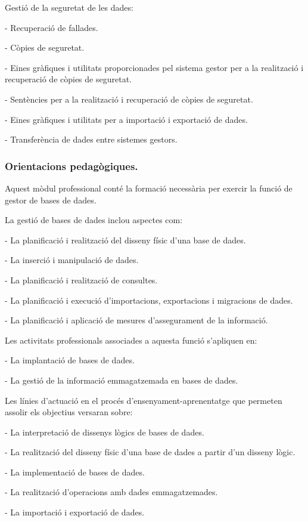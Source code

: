 \documentclass[catalan, a4paper, 12pt, titlepage]{article}
\begin{document}
Gestió de la seguretat de les dades:

- Recuperació de fallades.

- Còpies de seguretat.

- Eines gràfiques i utilitats proporcionades pel sistema gestor per a la realització i recuperació de còpies de seguretat.

- Sentències per a la realització i recuperació de còpies de seguretat.

- Eines gràfiques i utilitats per a importació i exportació de dades.

- Transferència de dades entre sistemes gestors.

\subsubsection{Orientacions pedagògiques.}

Aquest mòdul professional conté la formació necessària per exercir la funció de gestor de bases de dades.

La gestió de bases de dades inclou aspectes com:

- La planificació i realització del disseny físic d'una base de dades.

- La inserció i manipulació de dades.

- La planificació i realització de consultes.

- La planificació i execució d'importacions, exportacions i migracions de dades.

- La planificació i aplicació de mesures d'assegurament de la informació.

Les activitats professionals associades a aquesta funció s'apliquen en:

- La implantació de bases de dades.

- La gestió de la informació emmagatzemada en bases de dades.

Les línies d'actuació en el procés d'ensenyament-aprenentatge que permeten assolir els objectius versaran sobre:

- La interpretació de dissenys lògics de bases de dades.

- La realització del disseny físic d'una base de dades a partir d'un disseny lògic.

- La implementació de bases de dades.

- La realització d'operacions amb dades emmagatzemades.

- La importació i exportació de dades.
\end{document}
